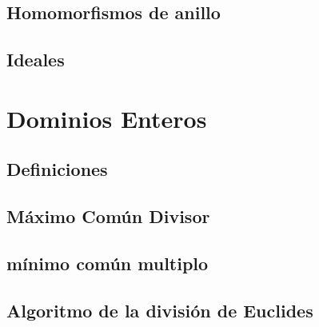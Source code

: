 
    \subsection{Homomorfismos de anillo}



    \subsection{Ideales}



\newpage
\section{Dominios Enteros}


    \subsection{Definiciones}



    \subsection{Máximo Común Divisor}



    \subsection{mínimo común multiplo}



    \subsection{Algoritmo de la división de Euclides}

